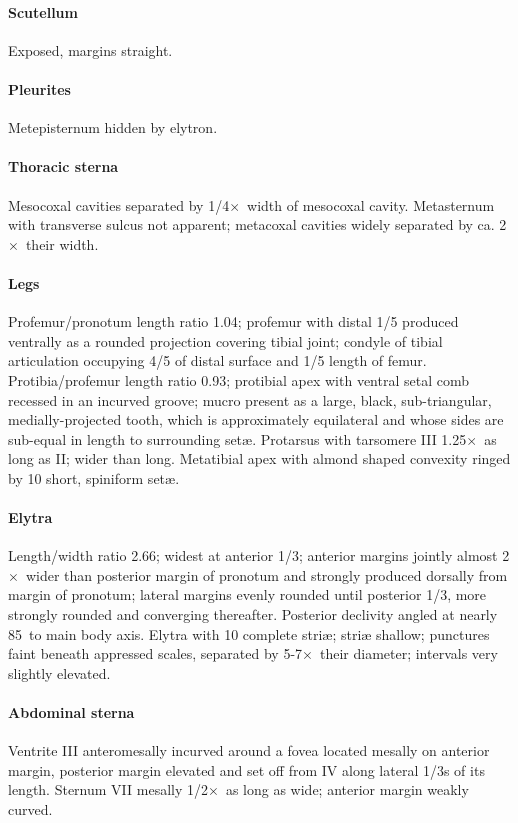 \documentclass[fleqn,10pt,lineno]{wlpeerj} %
\newcommand{\td}{\textdegree~}
\newcommand{\x}{$\times$~}
\begin{document}
			\paragraph{Scutellum}
				Exposed, margins straight.
			\paragraph{Pleurites}
				Metepisternum hidden by elytron.
			\paragraph{Thoracic sterna}
				Mesocoxal cavities separated by 1/4\x width of mesocoxal cavity. 
				Metasternum with transverse sulcus not apparent; metacoxal cavities widely separated by ca. 2\x their width.
			\paragraph{Legs}
				Profemur/pronotum length ratio 1.04; profemur with distal 1/5 produced ventrally as a rounded projection covering tibial joint; condyle of tibial articulation occupying 4/5 of distal surface and 1/5 length of femur. 
				Protibia/profemur length ratio 0.93; protibial apex with ventral setal comb recessed in an incurved groove; mucro present as a large, black, sub-triangular, medially-projected tooth, which is approximately equilateral and whose sides are sub-equal in length to surrounding set{\ae}. 
				Protarsus with tarsomere III 1.25\x as long as II; wider than long. 
				Metatibial apex with almond shaped convexity ringed by 10 short, spiniform set{\ae}.
			\paragraph{Elytra}
				Length/width ratio 2.66; widest at anterior 1/3; anterior margins jointly almost 2\x wider than posterior margin of pronotum and strongly produced dorsally from margin of pronotum; lateral margins evenly rounded until posterior 1/3, more strongly rounded and converging thereafter. 
				Posterior declivity angled at nearly 85\td to main body axis. Elytra with 10 complete stri{\ae}; stri{\ae} shallow; punctures faint beneath appressed scales, separated by 5-7\x their diameter; intervals very slightly elevated.
			\paragraph{Abdominal sterna}
				Ventrite III anteromesally incurved around a fovea located mesally on anterior margin, posterior margin elevated and set off from IV along lateral 1/3s of its length. 
				Sternum VII mesally 1/2\x as long as wide; anterior margin weakly curved.
\end{document}
